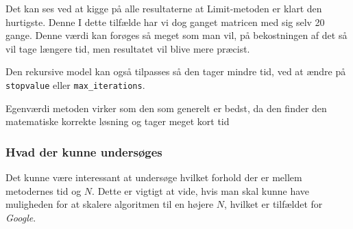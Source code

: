 Det kan ses ved at kigge på alle resultaterne at Limit-metoden er klart den hurtigste. Denne I dette tilfælde har vi dog ganget matricen med sig selv 20 gange. Denne værdi kan forøges så meget som man vil, på bekostningen af det så vil tage længere tid, men resultatet vil blive mere præcist.

Den rekursive model kan også tilpasses så den tager mindre tid, ved at ændre på \texttt{stopvalue} eller \texttt{max\_iterations}.

Egenværdi metoden virker som den som generelt er bedst, da den finder den matematiske korrekte løsning og tager meget kort tid

\subsubsection{Hvad der kunne undersøges}
Det kunne være interessant at undersøge hvilket forhold der er mellem metodernes tid og $N$. Dette er vigtigt at vide, hvis man skal kunne have muligheden for at skalere algoritmen til en højere $N$, hvilket er tilfældet for \emph{Google}.

